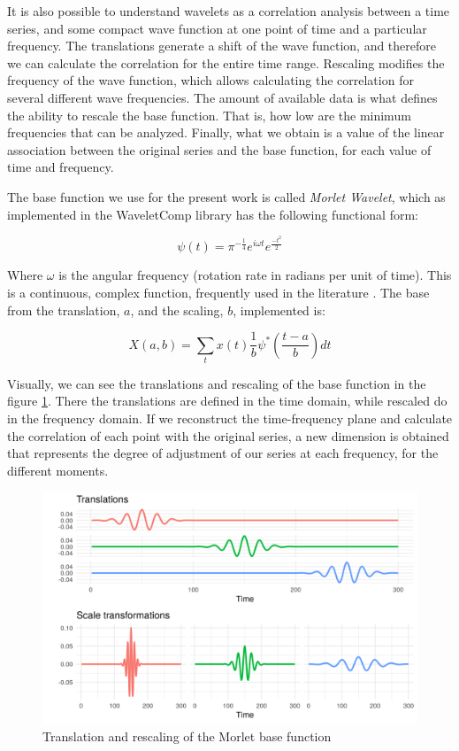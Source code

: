 \documentclass[a4paper]{article}
\begin{document}
	It is also possible to understand wavelets as a correlation analysis between a time series, and some compact wave function at one point of time and a particular frequency. The translations generate a shift of the wave function, and therefore we can calculate the correlation for the entire time range. Rescaling modifies the frequency of the wave function, which allows calculating the correlation for several different wave frequencies. The amount of available data is what defines the ability to rescale the base function. That is, how low are the minimum frequencies that can be analyzed. Finally, what we obtain is a value of the linear association between the original series and the base function, for each value of time and frequency.
	
	The base function we use for the present work is called \textit{Morlet Wavelet}, which as implemented in the WaveletComp \citep{Roesch2018} library has the following functional form:
	
	$$
	\psi(t)=\pi^{-\frac{1}{4}}e^{i\omega t}e^{\frac{-t^2}{2}}
	$$
	
	
	Where $\omega$ is the angular frequency (rotation rate in radians per unit of time). This is a continuous, complex function, frequently used in the literature \citep{conraria2011continuous}. The base from the translation, $a$, and the scaling, $b$, implemented is:
	
	$$
	X(a,b)=\sum_{t} x(t)   \frac{1}{b} \psi^*\left(\frac{t-a}{b}\right)dt
	$$
	
	Visually, we can see the translations and rescaling of the base function in the figure \ref{fig:morlet}. There the translations are defined in the time domain, while rescaled do in the frequency domain. If we reconstruct the time-frequency plane and calculate the correlation of each point with the original series, a new dimension is obtained that represents the degree of adjustment of our series at each frequency, for the different moments.
	
	\begin{figure}[H]
		\centering
		\includegraphics[width=\linewidth]{morelt_en.png}
		\caption{Translation and rescaling of the Morlet base function} \label{fig:morlet}
	\end{figure}
	
\end{document}

